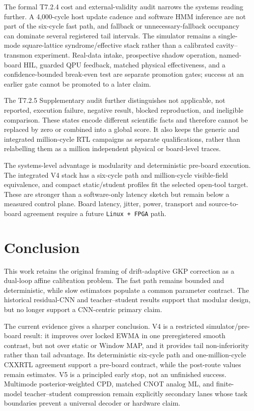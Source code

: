 \documentclass[11pt]{article}
\begin{document}
The formal T7.2.4 cost and external-validity audit narrows the systems reading
further.  A 4,000-cycle host update cadence and software HMM inference are not
part of the six-cycle fast path, and fallback or unnecessary-fallback occupancy
can dominate several registered tail intervals.  The simulator remains a
single-mode square-lattice syndrome/effective stack rather than a calibrated
cavity--transmon experiment.  Real-data intake, prospective shadow operation,
named-board HIL, guarded QPU feedback, matched physical effectiveness, and a
confidence-bounded break-even test are separate promotion gates; success at an
earlier gate cannot be promoted to a later claim.

The T7.2.5 Supplementary audit further distinguishes not applicable, not
reported, execution failure, negative result, blocked reproduction, and
ineligible comparison.  These states encode different scientific facts and
therefore cannot be replaced by zero or combined into a global score.  It also
keeps the generic and integrated million-cycle RTL campaigns as separate
qualifications, rather than relabelling them as a million independent physical
or board-level traces.

The systems-level advantage is modularity and deterministic pre-board
execution.  The integrated V4 stack has a six-cycle path and million-cycle
visible-field equivalence, and compact static/student profiles fit the selected
open-tool target.  These are stronger than a software-only latency sketch but
remain below a measured control plane.  Board latency, jitter, power, transport
and source-to-board agreement require a future \texttt{Linux + FPGA} path.

\section{Conclusion}

This work retains the original framing of drift-adaptive GKP correction as a
dual-loop affine calibration problem.  The fast path remains bounded and
deterministic, while slow estimators populate a common parameter contract.  The
historical residual-CNN and teacher--student results support that modular design,
but no longer support a CNN-centric primary claim.

The current evidence gives a sharper conclusion.  V4 is a restricted
simulator/pre-board result: it improves over locked EWMA in one preregistered
smooth contrast, but not over static or Window MAP, and it provides tail
non-inferiority rather than tail advantage.  Its deterministic six-cycle path
and one-million-cycle CXXRTL agreement support a pre-board contract, while the
post-route values remain estimates.  V5 is a principled early stop, not an
unfinished success.  Multimode posterior-weighted CPD, matched CNOT analog ML,
and finite-model teacher--student compression remain explicitly secondary
lanes whose task boundaries prevent a universal decoder or hardware claim.
\end{document}
